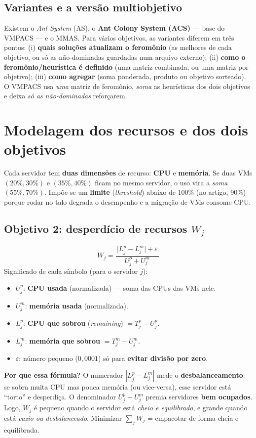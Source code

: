 \documentclass[11pt]{article}
\newcommand{\var}[1]{\textcolor{azul}{$#1$}}
\begin{document}
\subsection{Variantes e a versão multiobjetivo}
Existem o \emph{Ant System} (AS), o \textbf{Ant Colony System (ACS)} --- base do
VMPACS --- e o MMAS. Para vários objetivos, as variantes diferem em três pontos:
(i) \textbf{quais soluções atualizam o feromônio} (as melhores de cada objetivo,
ou só as não-dominadas guardadas num arquivo externo); (ii) \textbf{como o
feromônio/heurística é definido} (uma matriz combinada, ou uma matriz por
objetivo); (iii) \textbf{como agregar} (soma ponderada, produto ou objetivo
sorteado). O VMPACS usa \emph{uma} matriz de feromônio, \emph{soma} as
heurísticas dos dois objetivos e deixa \emph{só as não-dominadas} reforçarem.

\section{Modelagem dos recursos e dos dois objetivos}
Cada servidor tem \textbf{duas dimensões} de recurso: \textbf{CPU} e
\textbf{memória}. Se duas VMs $(20\%,30\%)$ e $(35\%,40\%)$ ficam no mesmo
servidor, o uso vira a \emph{soma} $(55\%,70\%)$. Impõe-se um \textbf{limite}
(\emph{threshold}) abaixo de 100\% (no artigo, 90\%) porque rodar no talo degrada
o desempenho e a migração de VMs consome CPU.

\subsection{Objetivo 2: desperdício de recursos \texorpdfstring{$W_j$}{Wj}}
\begin{equation*}
W_j=\frac{\,\big|L^p_j-L^m_j\big|+\varepsilon\,}{U^p_j+U^m_j}
\end{equation*}
Significado de cada símbolo (para o servidor \var{j}):
\begin{itemize}[leftmargin=1.4em,itemsep=1pt]
  \item \var{U^p_j}: \textbf{CPU usada} (normalizada) — soma das CPUs das VMs nele.
  \item \var{U^m_j}: \textbf{memória usada} (normalizada).
  \item \var{L^p_j}: \textbf{CPU que sobrou} (\emph{remaining}) $= T^p_j-U^p_j$.
  \item \var{L^m_j}: \textbf{memória que sobrou} $= T^m_j-U^m_j$.
  \item \var{\varepsilon}: número pequeno ($0{,}0001$) só para \textbf{evitar
  divisão por zero}.
\end{itemize}
\begin{ideia}
\textbf{Por que essa fórmula?} O numerador \var{|L^p_j-L^m_j|} mede o
\textbf{desbalanceamento}: se sobra muita CPU mas pouca memória (ou vice-versa),
esse servidor está ``torto'' e desperdiça. O denominador \var{U^p_j+U^m_j}
premia servidores \textbf{bem ocupados}. Logo, \var{W_j} é pequeno quando o
servidor está \emph{cheio e equilibrado}, e grande quando está \emph{vazio ou
desbalanceado}. Minimizar $\sum_j W_j$ = empacotar de forma cheia e equilibrada.
\end{ideia}
\end{document}
